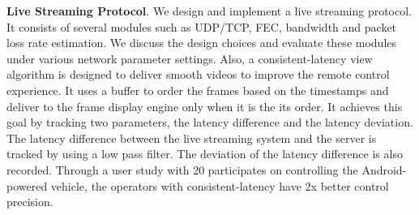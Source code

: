 \textbf{Live Streaming Protocol}.
We design and implement a live streaming protocol. 
It consists of several modules such as UDP/TCP, FEC, 
bandwidth and packet loss rate estimation. 
We discuss the design choices and evaluate these modules
under various network parameter settings. 
Also, a consistent-latency view algorithm 
is designed to deliver smooth
videos to improve the remote control experience. 
It uses a buffer to order the frames based on the timestamps
and deliver to the frame display engine only when it is 
the its order.
It achieves this goal by tracking two parameters, 
the latency difference and the latency deviation.   
The latency difference between
the live streaming system and the server is
tracked by using a low pass filter. 
The deviation of the latency difference is also recorded. 
Through a user study with 20 participates on controlling the Android-powered
vehicle, the operators with consistent-latency have
2x better control precision. 

